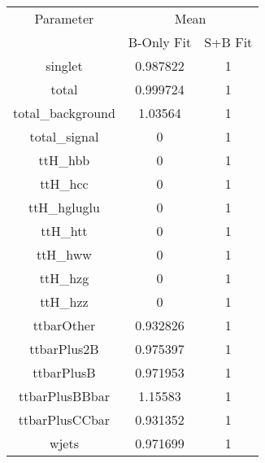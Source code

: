 \begin{table}
\centering
\begin{tabular}{ccc}
\toprule
Parameter & \multicolumn{2}{c}{Mean}\\
 & B-Only Fit & S+B Fit\\
\midrule
singlet & \num{0.987822} & \num{1}\\
total & \num{0.999724} & \num{1}\\
total\_background & \num{1.03564} & \num{1}\\
total\_signal & \num{0} & \num{1}\\
ttH\_hbb & \num{0} & \num{1}\\
ttH\_hcc & \num{0} & \num{1}\\
ttH\_hgluglu & \num{0} & \num{1}\\
ttH\_htt & \num{0} & \num{1}\\
ttH\_hww & \num{0} & \num{1}\\
ttH\_hzg & \num{0} & \num{1}\\
ttH\_hzz & \num{0} & \num{1}\\
ttbarOther & \num{0.932826} & \num{1}\\
ttbarPlus2B & \num{0.975397} & \num{1}\\
ttbarPlusB & \num{0.971953} & \num{1}\\
ttbarPlusBBbar & \num{1.15583} & \num{1}\\
ttbarPlusCCbar & \num{0.931352} & \num{1}\\
wjets & \num{0.971699} & \num{1}\\
\bottomrule
\end{tabular}
\end{table}